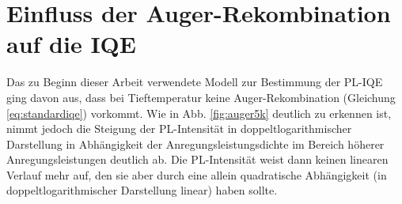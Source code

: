 
\chapter{Einfluss der Auger-Rekombination auf die IQE}
\label{chap:auger}
\thispagestyle{fancy}
Das zu Beginn dieser Arbeit verwendete Modell zur Bestimmung der PL-IQE ging davon aus, dass bei Tieftemperatur keine Auger-Rekombination (Gleichung \ref{eq:standardiqe}) vorkommt. Wie in Abb. \ref{fig:auger5k} deutlich zu erkennen ist, nimmt jedoch die Steigung der PL-Intensität in doppeltlogarithmischer Darstellung in Abhängigkeit der Anregungsleistungsdichte im Bereich höherer Anregungsleistungen deutlich ab. Die PL-Intensität weist dann keinen linearen Verlauf mehr auf, den sie aber durch eine allein quadratische Abhängigkeit (in doppeltlogarithmischer Darstellung linear) haben sollte. 
\newline

